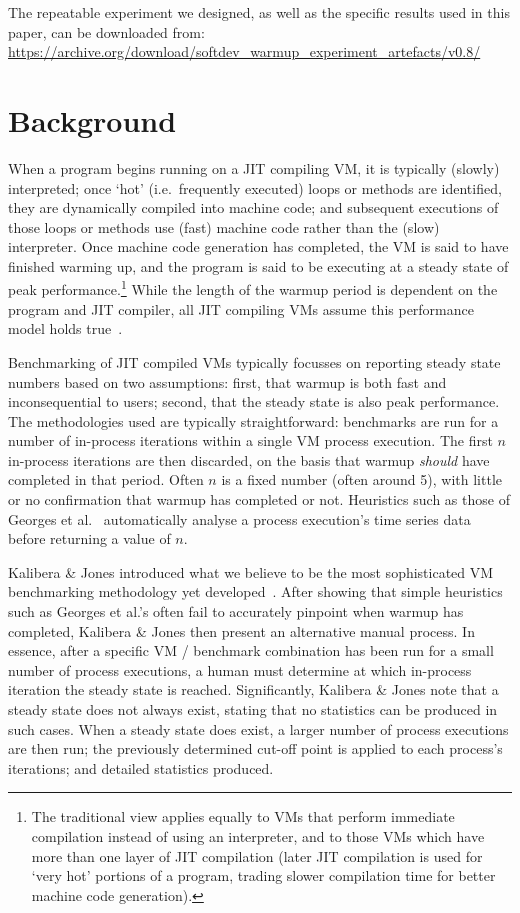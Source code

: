 \documentclass[acmlarge]{acmart}\settopmatter{printfolios=true}
\newcommand{\kalibera}{Kalibera \& Jones\xspace}
\begin{document}
The repeatable experiment we designed, as well as the specific results used
in this paper, can be downloaded from:
\url{https://archive.org/download/softdev_warmup_experiment_artefacts/v0.8/}


\section{Background}
\label{sec:warmup}

When a program begins running on a JIT compiling VM, it is typically (slowly)
interpreted; once `hot' (i.e.~frequently executed) loops or methods are
identified, they are dynamically compiled into machine code; and subsequent
executions of those loops or methods use (fast) machine code rather than the
(slow) interpreter. Once machine code generation has completed, the VM is
said to have finished warming up, and the program is said to be executing
at a steady state of peak performance.\footnote{The traditional view applies equally to VMs
that perform immediate compilation instead of using an interpreter, and to
those VMs which have more than one layer of JIT compilation (later JIT
compilation is used for `very hot' portions of a program, trading slower
compilation time for better machine code generation).}
While the length of the warmup period
is dependent on the program and JIT compiler, all JIT compiling
VMs assume this performance model holds true~\cite{kalibera13rigorous}.

Benchmarking of JIT compiled VMs typically focusses on reporting
steady state numbers based on two assumptions: first, that warmup is both fast and
inconsequential to users; second, that the steady state is also peak performance.
The methodologies used are typically straightforward: benchmarks are run for a number
of in-process iterations within a single VM process execution.
The first $n$ in-process iterations
are then discarded, on the basis that warmup \emph{should} have completed in
that period. Often $n$ is a fixed number (often around 5), with little or no confirmation
that warmup has completed or not. Heuristics such as
those of Georges et al.~\cite{georges07statistically} automatically analyse
a process execution's time series data before returning a value of $n$.

\kalibera introduced what we believe to be the most sophisticated VM benchmarking methodology
yet developed~\cite{kalibera12quantifying,kalibera13rigorous}. After
showing that simple heuristics such as Georges et al.'s often fail to accurately
pinpoint when warmup has completed, \kalibera then present an alternative manual
process. In essence, after a specific VM / benchmark combination has been run for a small number of
process executions, a human must determine at which in-process iteration the
steady state is reached. Significantly, \kalibera note that a steady
state does not always exist, stating that no statistics can be produced in
such cases. When a steady state does exist, a larger number of process executions are then
run; the previously determined cut-off point is applied to each process's
iterations; and detailed statistics produced.
\end{document}
